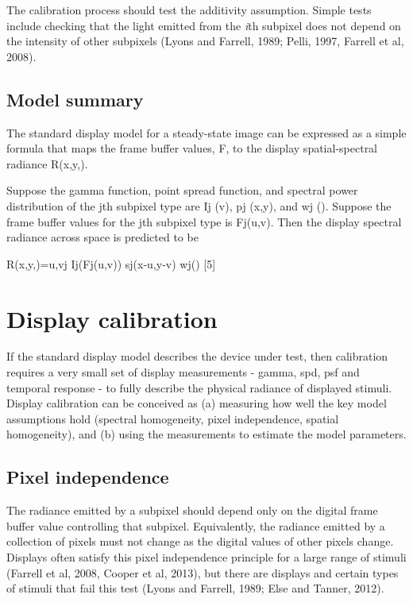 \documentclass[
  letterpaper,
]{book}
\begin{document}
The calibration process should test the additivity assumption. Simple
tests include checking that the light emitted from the \emph{i}th
subpixel does not depend on the intensity of other subpixels (Lyons and
Farrell, 1989; Pelli, 1997, Farrell et al, 2008).

\subsection{Model summary}\label{model-summary}

The standard display model for a steady-state image can be expressed as
a simple formula that maps the frame buffer values, F, to the display
spatial-spectral radiance R(x,y,).

Suppose the gamma function, point spread function, and spectral power
distribution of the jth subpixel type are Ij (v), pj (x,y), and wj ().
Suppose the frame buffer values for the jth subpixel type is Fj(u,v).
Then the display spectral radiance across space is predicted to be

R(x,y,)=u,vj Ij(Fj(u,v)) sj(x-u,y-v) wj() {[}5{]}

\section{Display calibration}\label{display-calibration}

If the standard display model describes the device under test, then
calibration requires a very small set of display measurements - gamma,
spd, psf and temporal response - to fully describe the physical radiance
of displayed stimuli. Display calibration can be conceived as (a)
measuring how well the key model assumptions hold (spectral homogeneity,
pixel independence, spatial homogeneity), and (b) using the measurements
to estimate the model parameters.

\subsection{Pixel independence}\label{pixel-independence}

The radiance emitted by a subpixel should depend only on the digital
frame buffer value controlling that subpixel. Equivalently, the radiance
emitted by a collection of pixels must not change as the digital values
of other pixels change. Displays often satisfy this pixel independence
principle for a large range of stimuli (Farrell et al, 2008, Cooper et
al, 2013), but there are displays and certain types of stimuli that fail
this test (Lyons and Farrell, 1989; Else and Tanner, 2012).
\end{document}
